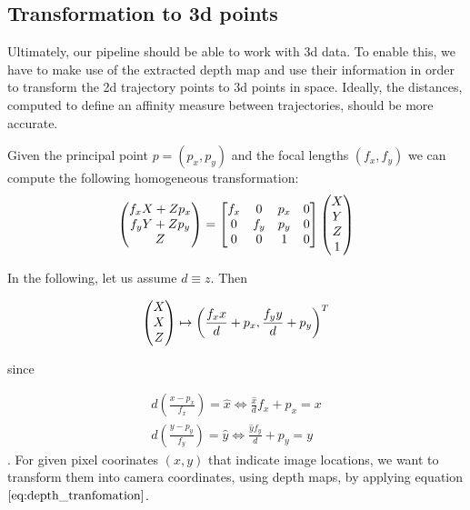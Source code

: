 \subsection{Transformation to 3d points}
\label{subsection:transform_to_3d_points}
Ultimately, our pipeline should be able to work with 3d data. To enable this, we have to make use of the extracted depth map and use their information in order to transform the 2d trajectory points to 3d points in space. Ideally, the distances, computed to define an affinity measure between trajectories, should be more accurate. 

Given the principal point $p = \left(p_x, p_y \right)$ and the focal lengths $\left(f_x, f_y \right)$ we can compute the following homogeneous transformation:
\begin{equation}
\colvec[f_x X + Z p_x]{f_y Y + Z p_y}{Z} =
\begin{bmatrix}
f_x & 0 & p_x & 0 \\
0 & f_y & p_y & 0 \\
0 & 0 & 1 & 0
\end{bmatrix}
\begin{pmatrix}
X \\
Y \\
Z \\
1
\end{pmatrix}
\end{equation}

In the following, let us assume $d \equiv z$. Then

\begin{equation}
	\colvec[X]{X}{Z} \mapsto \left( \frac{f_x x}{d} + p_x, \frac{f_y y}{d} + p_y \right)^T
\end{equation}

since

\begin{equation}
\begin{aligned}
	d \left( \frac{x - p_x}{f_x} \right) = \hat{x} \Leftrightarrow \frac{\hat{x}}{d} f_x + p_x = x \\
	d \left( \frac{y - p_y}{f_y} \right) = \hat{y} \Leftrightarrow \frac{\hat{y} f_y}{d} + p_y = y 
\end{aligned}
\label{eq:depth_tranfomation}
\end{equation}.
For given pixel coorinates $\left( x,y \right)$ that indicate image locations, we want to transform them into camera coordinates, using depth maps, by applying equation $\ref{eq:depth_tranfomation}$. \\ \\

